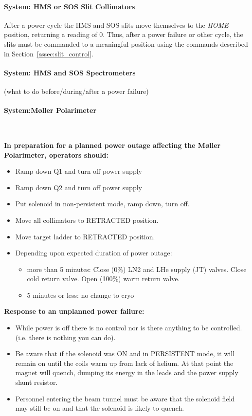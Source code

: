 \paragraph {System: HMS or SOS Slit Collimators}
After a power cycle the HMS and SOS slits move themselves to the {\it HOME} position,
returning a reading of 0. Thus, after a power failure or other cycle, the slits
must be commanded to a meaningful position using the commands described in
Section~\ref{sssec:slit_control}.
\paragraph {System: HMS and SOS Spectrometers}
(what to do before/during/after a power failure)

\pagebreak[2]
\paragraph {System:M\o ller Polarimeter}~ 

{\bf In preparation for a planned power outage affecting the M\o ller Polarimeter, 
operators should:}

\begin{itemize}
\item Ramp down Q1 and turn off power supply
\item Ramp down Q2 and turn off power supply
\item Put solenoid in non-persistent mode, ramp down, turn off.
\item Move all collimators to RETRACTED position.
\item Move target ladder to RETRACTED position.
\item Depending upon expected duration of power outage:
	\begin{itemize}

   	 \item{more than 5 minutes:}
        Close (0\%) LN2 and LHe supply (JT) valves.
        Close cold return valve.
        Open (100\%) warm return valve.

   	 \item{5 minutes or less:} no change to cryo
	\end{itemize}
\end{itemize}

{\bf Response to an unplanned power failure:}
\begin{itemize}
\item While power is off there is no control nor is there anything
to be controlled. (i.e. there is nothing you can do).

\item Be aware that if the solenoid was ON and in PERSISTENT mode,
it will remain on until the coils warm up from lack of helium.
At that point the magnet will quench, dumping its energy in
the leads and the power supply shunt resistor.

\item Personnel entering the beam tunnel must be aware that the
solenoid field may still be on and that the solenoid is likely
to quench.
\end{itemize}

